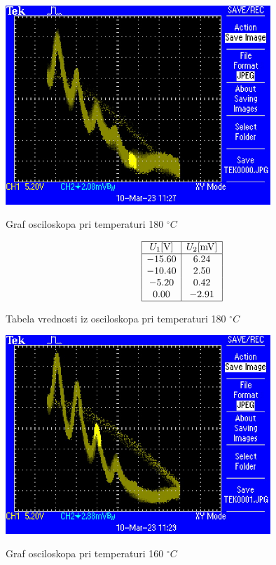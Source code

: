 \documentclass[12pt]{report}
\begin{document}
\begin{slika}[H]
  \centering
  \includegraphics[width= 0.75\textwidth]{TEK0000}
  \caption{\small Graf osciloskopa pri temperaturi 180 $^\circ C$}
\end{slika}

\begin{tabela}[H]
  \centering
  \[
      \begin{array}{|c|c|c|} \hline
        U_1 [\si{V}] & U_2 [\si{mV}] \\ \hline
        -15.60 &    6.24\\
        -10.40 &    2.50\\
         -5.20 &    0.42\\
          0.00 &  -2.91 \\ \hline
    \end{array}
  \]
  \caption{\small Tabela vrednosti iz osciloskopa pri temperaturi 180 $^\circ C$}
\end{tabela}

\begin{slika}[H]
  \centering
  \includegraphics[width= 0.75\textwidth]{TEK0001}
  \caption{\small Graf osciloskopa pri temperaturi 160 $^\circ C$}
\end{slika}
\end{document}
